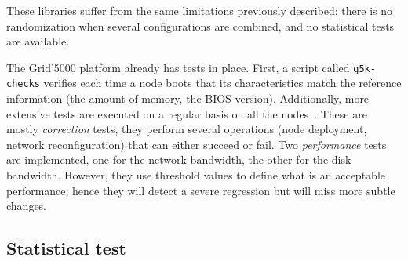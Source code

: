                 These libraries suffer from the same limitations previously described: there is no randomization when
                several configurations are combined, and no statistical tests are available.

                The Grid'5000 platform already has tests in place. First, a script called \texttt{g5k-checks} verifies
                each time a node boots that its characteristics match the reference information (\eg the amount of
                memory, the BIOS version). Additionally, more extensive tests are executed on a regular basis on all the
                nodes~\cite{nussbaum:hal-01538682}. These are mostly \emph{correction} tests, they perform several
                operations (\eg node deployment, network reconfiguration) that can either succeed or fail. Two
                \emph{performance} tests are implemented, one for the network bandwidth, the other for the disk
                bandwidth.  However, they use threshold values to define what is an acceptable performance, hence they
                will detect a severe regression but will miss more subtle changes.

        \subsection{Statistical test}%
        \label{sub:statistical_test}

